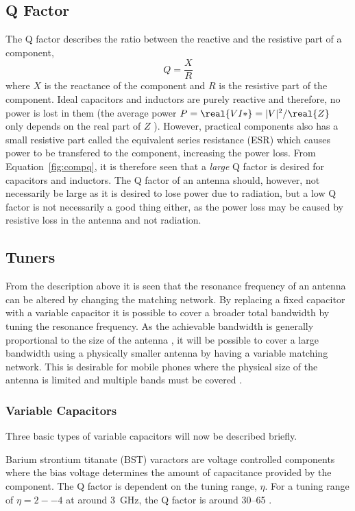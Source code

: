\subsection{Q Factor}
The Q factor describes the ratio between the reactive and the resistive part of a component,
\begin{equation}
    \label{fig:compq}
    Q = \frac{X}{R}
\end{equation}
where $X$ is the reactance of the component and $R$ is the resistive part of the component. Ideal capacitors and inductors are purely reactive and therefore, no power is lost in them (the average power $P = \real{VI*} = |V|^2 / \real{Z}$ only depends on the real part of $Z$ \cite{irwin2011engineering}). However, practical components also has a small resistive part called the equivalent series resistance (ESR) which causes power to be transfered to the component, increasing the power loss. From Equation~\ref{fig:compq}, it is therefore seen that a \emph{large} Q factor is desired for capacitors and inductors. The Q factor of an antenna should, however, not necessarily be large as it is desired to lose power due to radiation, but a low Q factor is not necessarily a good thing either, as the power loss may be caused by resistive loss in the antenna and not radiation.

\subsection{Tuners}
From the description above it is seen that the resonance frequency of an antenna can be altered by changing the matching network. By replacing a fixed capacitor with a variable capacitor it is possible to cover a broader total bandwidth by tuning the resonance frequency. As the achievable bandwidth is generally proportional to the size of the antenna , it will be possible to cover a large bandwidth using a physically smaller antenna by having a variable matching network. This is desirable for mobile phones where the physical size of the antenna is limited and multiple bands must be covered \cite{gu2014rf}.

\subsubsection{Variable Capacitors}
Three basic types of variable capacitors will now be described briefly. 

Barium strontium titanate (BST) varactors are voltage controlled components where the bias voltage determines the amount of capacitance provided by the component. The Q factor is dependent on the tuning range, $\eta$. For a tuning range of $\eta = 2--4$ at around \SI{3}{GHz}, the Q factor is around 30--65 \cite{gu2014rf}. 

